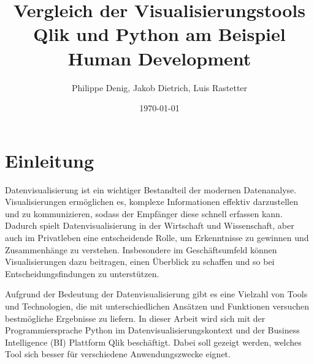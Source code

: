 \documentclass[12pt]{article}
\begin{document}
	
	\title{Vergleich der Visualisierungstools Qlik und Python am Beispiel Human Development}
	\author{Philippe Denig, Jakob Dietrich, Luis Rastetter}
	\date{\today}
	
	\maketitle
	
	\newpage
	
	\tableofcontents
	
	\newpage
	
	
	\section{Einleitung} %
	
	
	Datenvisualisierung ist ein wichtiger Bestandteil der modernen Datenanalyse. Visualisierungen ermöglichen es, komplexe Informationen effektiv darzustellen und zu kommunizieren, sodass der Empfänger diese schnell erfassen kann. Dadurch spielt Datenvisualisierung in der Wirtschaft und Wissenschaft, aber auch im Privatleben eine entscheidende Rolle, um Erkenntnisse zu gewinnen und Zusammenhänge zu verstehen. Insbesondere im Geschäftsumfeld können Visualisierungen dazu beitragen, einen Überblick zu schaffen und so bei Entscheidungsfindungen zu unterstützen.
	
	Aufgrund der Bedeutung der Datenvisualisierung gibt es eine Vielzahl von Tools und Technologien, die mit unterschiedlichen Ansätzen und Funktionen versuchen bestmögliche Ergebnisse zu liefern. In dieser Arbeit wird sich mit der Programmiersprache Python im Datenvisualisierungskontext und der Business Intelligence (BI) Plattform Qlik beschäftigt. Dabei soll gezeigt werden, welches Tool sich besser für verschiedene Anwendungszwecke eignet.
	
\end{document}
